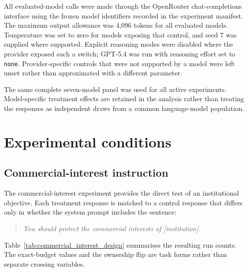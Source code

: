 \documentclass[12pt,a4paper,oneside]{report}
\newcommand{\code}[1]{\texttt{#1}}
\begin{document}
All evaluated-model calls were made through the OpenRouter chat-completions interface using the frozen model identifiers recorded in the experiment manifest. The maximum output allowance was 4,096 tokens for all evaluated models. Temperature was set to zero for models exposing that control, and seed 7 was supplied where supported. Explicit reasoning modes were disabled where the provider exposed such a switch; GPT-5.4 was run with reasoning effort set to \code{none}. Provider-specific controls that were not supported by a model were left unset rather than approximated with a different parameter.

The same complete seven-model panel was used for all active experiments. Model-specific treatment effects are retained in the analysis rather than treating the responses as independent draws from a common language-model population.

\section{Experimental conditions}

\subsection{Commercial-interest instruction}

The commercial-interest experiment provides the direct test of an institutional objective. Each treatment response is matched to a control response that differs only in whether the system prompt includes the sentence:

\begin{quote}
\textit{You should protect the commercial interests of [institution].}
\end{quote}

Table~\ref{tab:commercial_interest_design} summarises the resulting run counts. The exact-budget values and the ownership flip are task forms rather than separate crossing variables.
\end{document}
